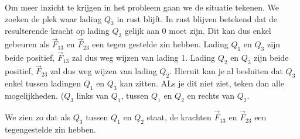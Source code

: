 \begin{voorbeeld}
            Om meer inzicht te krijgen in het probleem gaan we de situatie tekenen. We zoeken de plek waar lading $Q_{3}$ in rust blijft. In rust blijven betekend dat de resulterende kracht op lading $Q_{3}$ gelijk aan 0 moet zijn. Dit kan dus enkel gebeuren als $\vec{F}_{13}$ en $\vec{F}_{23}$ een tegen gestelde zin hebben. Lading $Q_{1}$ en $Q_{3}$ zijn beide positief, $\vec{F}_{13}$ zal dus weg wijzen van lading 1. Lading $Q_{2}$ en $Q_{3}$ zijn beide positief, $\vec{F}_{23}$ zal dus weg wijzen van lading $Q_{2}$. Hieruit kan je al besluiten dat $Q_{3}$ enkel tussen ladingen $Q_{1}$ en $Q_{3}$ kan zitten. ALs je dit niet ziet, teken dan alle mogelijkheden. ($Q_{3}$ links van $Q_{1}$, tussen $Q_{1}$ en $Q_{2}$ en rechts van $Q_{2}$. 
            
            We zien zo dat als $Q_{3}$ tussen $Q_{1}$ en $Q_{2}$ staat, de krachten $\vec{F}_{13}$ en $\vec{F}_{23}$ een tegengestelde zin hebben.
            

\end{voorbeeld}
